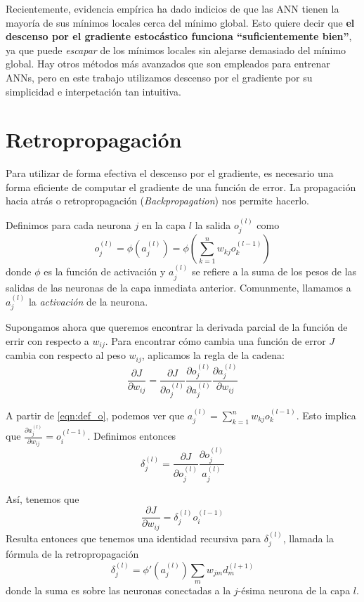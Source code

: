 Recientemente, evidencia empírica \cite{choromanska} ha dado indicios
de que las ANN tienen la mayoría de sus mínimos locales cerca del
mínimo global. Esto quiere decir que \textbf{el descenso por el
gradiente estocástico funciona ``suficientemente bien''}, ya que
puede \textit{escapar} de los mínimos locales sin alejarse demasiado
del mínimo global. Hay otros métodos más avanzados que son empleados
para entrenar ANNs, pero en este trabajo utilizamos descenso por el
gradiente por su simplicidad e interpetación tan intuitiva.

\section{Retropropagación}
Para utilizar de forma efectiva el descenso por el gradiente, es
necesario una forma eficiente de computar el gradiente de una función
de error. La propagación hacia atrás o retropropagación
(\textit{Backpropagation}) nos permite hacerlo.

Definimos para cada neurona $j$ en la capa $l$ la salida $o^{(l)}_j$ como
\begin{equation}
\label{eqn:def_o}
  o^{(l)}_j = \phi(a^{(l)}_j) = \phi(\sum_{k=1}^n w_{kj}o_k^{(l-1)})
\end{equation}
donde $\phi$ es la función de activación y $a_j^{(l)}$ se refiere a la
suma de los pesos de las salidas de las neuronas de la capa inmediata
anterior. Comunmente, llamamos a $a_j^{(l)}$ la \textit{activación} de
la neurona.

Supongamos ahora que queremos encontrar la derivada parcial de la
función de errir con respecto a $w_{ij}$.
Para encontrar cómo cambia una función de error $J$ cambia con respecto
al peso $w_{ij}$, aplicamos la regla de la cadena:
\begin{equation}
  \frac{\partial J}{\partial w_{ij}} = \frac{\partial J}{\partial o_j^{(l)}}
  \frac{\partial o_j^{(l)}}{\partial a_j^{(l)}} \frac{\partial a_j^{(l)}}{\partial w_{ij}}
\end{equation}

A partir de \ref{eqn:def_o}, podemos ver que
$a_j^{(l)} = \sum_{k=1}^n w_{kj}o_k^{(l-1)}$. Esto implica que
$\frac{\partial a_j^{(l)}}{\partial w_{ij}} = o_i^{(l-1)}$. Definimos entonces
\begin{equation}
  \delta_j^{(l)} = \frac{\partial J}{\partial o_j^{(l)}} \frac{\partial o_j^{(l)}}{a_j^{(l)}}
\end{equation}

Así, tenemos que
\begin{equation}
  \frac{\partial J}{\partial w_{ij}} = \delta_j^{(l)}o_i^{(l-1)}
\end{equation}
Resulta entonces que tenemos una identidad recursiva para
$\delta_j^{(l)}$, llamada la fórmula de la retropropagación
\begin{equation}
  \delta_j^{(l)} = \phi'(a_j^{(l)})\sum_m w_{jm} d_m^{(l+1)}
\end{equation}
donde la suma es sobre las neuronas conectadas a la $j$-ésima neurona
de la capa $l$.

